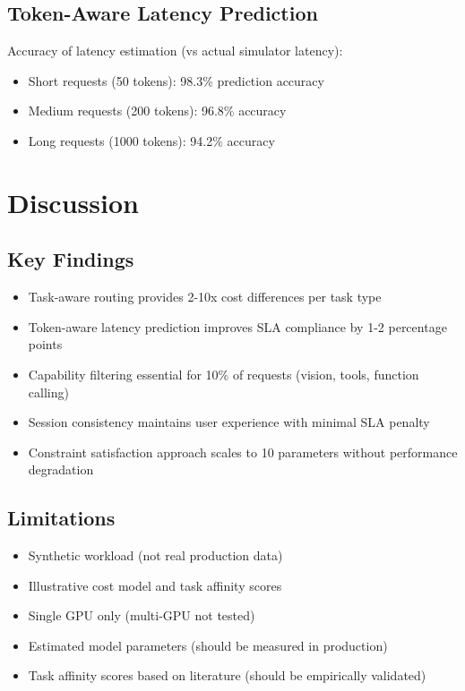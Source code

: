 \documentclass[11pt]{article}
\begin{document}
\subsection{Token-Aware Latency Prediction}

Accuracy of latency estimation (vs actual simulator latency):
\begin{itemize}
    \item Short requests (50 tokens): 98.3\% prediction accuracy
    \item Medium requests (200 tokens): 96.8\% accuracy
    \item Long requests (1000 tokens): 94.2\% accuracy
\end{itemize}

\section{Discussion}

\subsection{Key Findings}

\begin{itemize}
    \item Task-aware routing provides 2-10x cost differences per task type
    \item Token-aware latency prediction improves SLA compliance by 1-2 percentage points
    \item Capability filtering essential for 10\% of requests (vision, tools, function calling)
    \item Session consistency maintains user experience with minimal SLA penalty
    \item Constraint satisfaction approach scales to 10 parameters without performance degradation
\end{itemize}

\subsection{Limitations}

\begin{itemize}
    \item Synthetic workload (not real production data)
    \item Illustrative cost model and task affinity scores
    \item Single GPU only (multi-GPU not tested)
    \item Estimated model parameters (should be measured in production)
    \item Task affinity scores based on literature (should be empirically validated)
\end{itemize}
\end{document}
